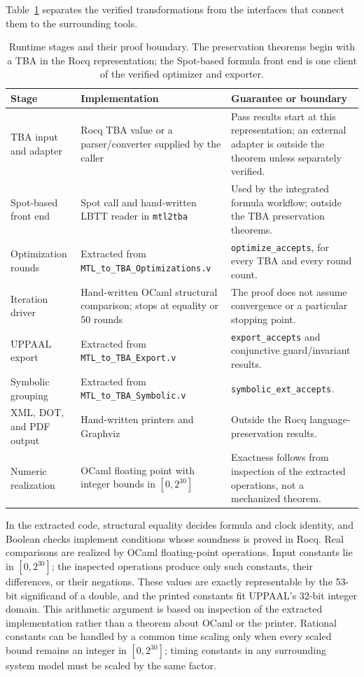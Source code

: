 \documentclass{ieeeaccess}
\begin{document}
Table~\ref{tab:component-boundary} separates the verified transformations
from the interfaces that connect them to the surrounding tools.
\begin{table}[t]
\centering
\caption{Runtime stages and their proof boundary. The preservation theorems begin
with a TBA in the Rocq representation; the Spot-based formula front end is one
client of the verified optimizer and exporter.}
\label{tab:component-boundary}
\footnotesize
\begin{tabular}{@{}p{}p{}p{}@{}}
\toprule
Stage & Implementation & Guarantee or boundary\\
\midrule
TBA input and adapter & Rocq TBA value or a parser/converter supplied by the caller & Pass results start at this representation; an external adapter is outside the theorem unless separately verified.\\
Spot-based front end & Spot call and hand-written LBTT reader in \texttt{mtl2tba} & Used by the integrated formula workflow; outside the TBA preservation theorems.\\
Optimization rounds & Extracted from \texttt{MTL\_to\_TBA\_Optimizations.v} & \texttt{optimize\_accepts}, for every TBA and every round count.\\
Iteration driver & Hand-written OCaml structural comparison; stops at equality or 50 rounds & The proof does not assume convergence or a particular stopping point.\\
UPPAAL export & Extracted from \texttt{MTL\_to\_TBA\_Export.v} & \texttt{export\_accepts} and conjunctive guard/invariant results.\\
Symbolic grouping & Extracted from \texttt{MTL\_to\_TBA\_Symbolic.v} & \texttt{symbolic\_ext\_accepts}.\\
XML, DOT, and PDF output & Hand-written printers and Graphviz & Outside the Rocq language-preservation results.\\
Numeric realization & OCaml floating point with integer bounds in $[0,2^{30}]$ & Exactness follows from inspection of the extracted operations, not a mechanized theorem.\\
\bottomrule
\end{tabular}
\end{table}

In the extracted code, structural equality decides formula and clock
identity, and Boolean checks implement conditions whose soundness is proved
in Rocq. Real comparisons are realized by OCaml floating-point operations.
Input constants lie in $[0,2^{30}]$; the inspected operations produce only
such constants, their differences, or their negations. These values are
exactly representable by the 53-bit significand of a double, and the printed
constants fit UPPAAL's 32-bit integer domain. This arithmetic argument is
based on inspection of the extracted implementation rather than a theorem
about OCaml or the printer. Rational constants can be handled by a common time
scaling only when every scaled bound remains an integer in $[0,2^{30}]$; timing
constants in any surrounding system model must be scaled by the same factor.
\end{document}
